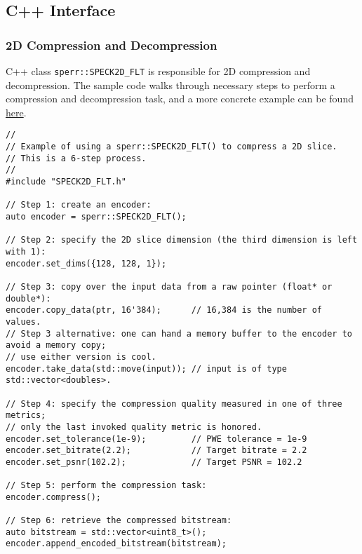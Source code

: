 \documentclass{article}
\begin{document}
\subsection{C++ Interface}
\label{sec:cpp}
\subsubsection{2D Compression and Decompression}
C++ class \texttt{sperr::SPECK2D\_FLT} is responsible for 2D compression and decompression.
The sample code walks through necessary steps to perform a compression and decompression
task, and a more concrete example can be found
\href{https://github.com/NCAR/SPERR/blob/main/utilities/sperr2d.cpp}{here}.

\begin{verbatim}
//
// Example of using a sperr::SPECK2D_FLT() to compress a 2D slice.
// This is a 6-step process.
//
#include "SPECK2D_FLT.h"

// Step 1: create an encoder:
auto encoder = sperr::SPECK2D_FLT();

// Step 2: specify the 2D slice dimension (the third dimension is left with 1):
encoder.set_dims({128, 128, 1});

// Step 3: copy over the input data from a raw pointer (float* or double*):
encoder.copy_data(ptr, 16'384);      // 16,384 is the number of values.
// Step 3 alternative: one can hand a memory buffer to the encoder to avoid a memory copy;
// use either version is cool.
encoder.take_data(std::move(input)); // input is of type std::vector<doubles>.

// Step 4: specify the compression quality measured in one of three metrics;
// only the last invoked quality metric is honored.
encoder.set_tolerance(1e-9);         // PWE tolerance = 1e-9
encoder.set_bitrate(2.2);            // Target bitrate = 2.2
encoder.set_psnr(102.2);             // Target PSNR = 102.2

// Step 5: perform the compression task:
encoder.compress();

// Step 6: retrieve the compressed bitstream:
auto bitstream = std::vector<uint8_t>();
encoder.append_encoded_bitstream(bitstream);
\end{verbatim}
\end{document}
